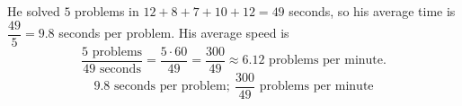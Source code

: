 He solved $5$ problems in $12+8+7+10+12=49$ seconds, so his average time is $\dfrac{49}{5}=9.8$ seconds per problem. His average speed is
\[\dfrac{5\text{ problems}}{49\text{ seconds}}=\dfrac{5\cdot60}{49}=\dfrac{300}{49}\approx6.12\text{ problems per minute}.\]
\[\boxed{9.8\text{ seconds per problem};\ \dfrac{300}{49}\text{ problems per minute}}\]
